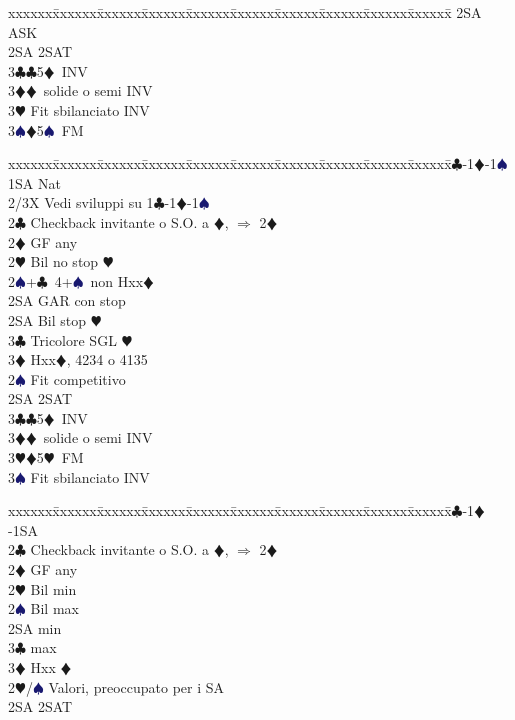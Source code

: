 \documentclass[a4paper,italian]{article}
\newcommand{\BC}{\textcolor{OliveGreen}{$\clubsuit$}}
\newcommand{\BD}{\textcolor{RedOrange}{$\vardiamondsuit$}}
\newcommand{\BH}{\textcolor{Red2}{$\varheartsuit${}}}
\newcommand{\BS}{\textcolor{MidnightBlue}{$\spadesuit${}}}
\newenvironment{bidtable}
{\begin{tabbing}

    xxxxxx\=xxxxxx\=xxxxxx\=xxxxxx\=xxxxxx\=xxxxxx\=xxxxxx\=xxxxxx\=xxxxxx\=xxxxxx\=\kill}
{\end{tabbing} }%
\begin{document}
\begin{multicols}{2}
\begin{bidtable}
        2SA \> ASK\-\\
        2SA \> 2SAT\\
        3\BC {}\BC 5\BD\ INV\\
        3\BD {}\BD\ solide o semi INV\\
        3\BH \> Fit sbilanciato INV\\
        3\BS {}\BD 5\BS\ FM\-
    \end{bidtable}
    \begin{bidtable}
        1\BC-1\BD-1\BS\+\\
        1SA \> Nat\+\\
        2/3X \> Vedi sviluppi su 1\BC -1\BD -1\BS \-\\
        2\BC \> Checkback invitante o S.O. a \BD , $\Rightarrow$ 2\BD \\
        2\BD \> GF any\+\\
        2\BH \> Bil no stop \BH \\
        2\BS {}+\BC\ 4+\BS\ non Hxx\BD \+\\
        2SA \> GAR con stop\-\\
        2SA \> Bil stop \BH \\
        3\BC \> Tricolore SGL \BH \\
        3\BD \> Hxx\BD, 4234 o 4135 \-\\
        [2pt]2\BS \> Fit competitivo\\
        2SA \> 2SAT\\
        3\BC {}\BC 5\BD\ INV\\
        3\BD {}\BD\ solide o semi INV\\
        3\BH {}\BD 5\BH\ FM\\
        3\BS \> Fit sbilanciato INV\-
    \end{bidtable}
    \begin{bidtable}
        1\BC-1\BD-1SA\+\\
        2\BC \> Checkback invitante o S.O. a \BD , $\Rightarrow$ 2\BD \\
        2\BD \> GF any\+\\
        2\BH \> Bil min\\
        2\BS \> Bil max\\
        2SA  min\\
        3\BC {} max\\
        3\BD \> Hxx \BD\-\\
        [2pt]2\BH/\BS \> Valori, preoccupato per i SA\\
        2SA \> 2SAT\\

\end{bidtable}
\end{multicols}
\end{document}
